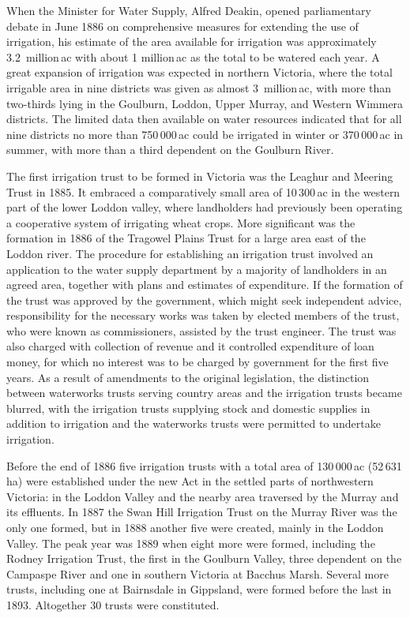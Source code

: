 When the Minister for Water Supply, Alfred Deakin, opened
parliamentary debate in June 1886 on comprehensive measures for
extending the use of irrigation, his estimate of the area available
for irrigation was approximately 3.2~million\,ac with about 1
million\,ac as the total to be watered each year.  A great expansion of irrigation was expected in
northern Victoria, where the total irrigable area in nine districts
was given as almost 3~million\,ac, with more than two-thirds lying in
the Goulburn, Loddon, Upper Murray, and Western Wimmera districts.
The limited data then available on water resources indicated that for
all nine districts no more than 750\,000\,ac could be irrigated in
winter or 370\,000\,ac in summer, with more than a third dependent on
the Goulburn River.

The first irrigation trust to be formed in Victoria was the Leaghur
and Meering Trust in 1885.  It embraced a comparatively small area of 10\,300\,ac
in the western part of the lower Loddon valley, where landholders had
previously been operating a cooperative system of irrigating wheat
crops.  More significant was the formation in 1886 of the Tragowel
Plains Trust for a large area east of the Loddon river.  The procedure
for establishing an irrigation trust involved an application to the
water supply department by a majority of landholders in an agreed
area, together with plans and estimates of expenditure.  If the
formation of the trust was approved by the government, which might
seek independent advice, responsibility for the necessary works was
taken by elected members of the trust, who were known as
commissioners, assisted by the trust engineer.  The trust was also
charged with collection of revenue and it controlled expenditure of
loan money, for which no interest was to be charged by government for
the first five years.  As a result of amendments to the original
legislation, the distinction between waterworks trusts serving country
areas and the irrigation trusts became blurred, with the irrigation
trusts supplying stock and domestic supplies in addition to irrigation
and the waterworks trusts were permitted to undertake irrigation.

Before the end of 1886 five irrigation trusts with a total area of
130\,000\,ac (52\,631\,ha) were established under the new Act in the
settled parts of northwestern Victoria: in the Loddon Valley and the
nearby area traversed by the Murray and its effluents.  In 1887 the
Swan Hill Irrigation Trust on the Murray River was the only one
formed, but in 1888 another five were created, mainly in the Loddon
Valley.  The peak year was 1889 when eight more were formed, including
the Rodney Irrigation Trust, the first in the Goulburn Valley, three
dependent on the Campaspe River and one in southern Victoria at
Bacchus Marsh.  Several more trusts, including one at Bairnsdale in
Gippsland, were formed before the last in 1893.  Altogether 30 trusts
were constituted.

